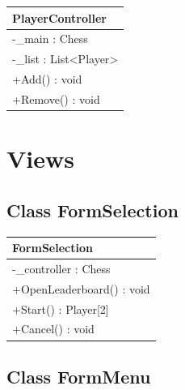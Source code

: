 \documentclass[12pt]{article}
\begin{document}
\begin{table}[H]
    \begin{tabular}{|l|}
    \hline
    \rowcolor[HTML]{C0C0C0} 
    \textbf{PlayerController}                       \\ \hline
    \rowcolor[HTML]{EFEFEF} 
    -\_main : Chess                               \\ \hline
    \rowcolor[HTML]{EFEFEF} 
    -\_list : List\textless{}Player\textgreater{} \\ \hline
    \rowcolor[HTML]{FFFFFF} 
    +Add() : void                                 \\ \hline
    \rowcolor[HTML]{FFFFFF} 
    +Remove() : void                              \\ \hline
    \end{tabular}
    \end{table}

\newpage


\section{Views}


\subsection{Class FormSelection}

\begin{table}[H]
    \begin{tabular}{|l|}
    \hline
    \rowcolor[HTML]{C0C0C0} 
    \textbf{FormSelection}    \\ \hline
    \rowcolor[HTML]{EFEFEF} 
    -\_controller : Chess      \\ \hline
    \rowcolor[HTML]{FFFFFF} 
    +OpenLeaderboard() : void \\ \hline
    \rowcolor[HTML]{FFFFFF} 
    +Start() : Player{[}2{]}  \\ \hline
    \rowcolor[HTML]{FFFFFF} 
    +Cancel() : void          \\ \hline
    \end{tabular}
\end{table}



\newpage


\subsection{Class FormMenu}
\end{document}

